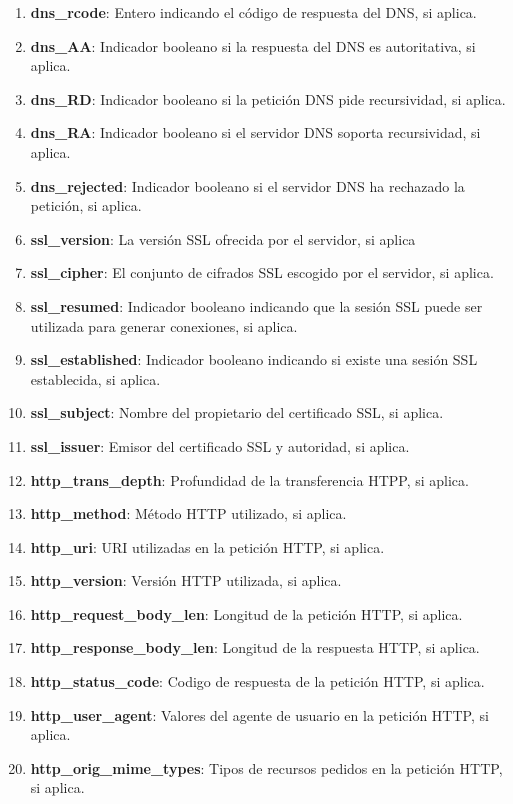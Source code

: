 \begin{enumerate}
  \item \textbf{dns\_rcode}: Entero indicando el código de respuesta del DNS, si aplica.
  \item \textbf{dns\_AA}: Indicador booleano si la respuesta del DNS es autoritativa, si aplica.
  \item \textbf{dns\_RD}: Indicador booleano si la petición DNS pide recursividad, si aplica.
  \item \textbf{dns\_RA}: Indicador booleano si el servidor DNS soporta recursividad, si aplica.
  \item \textbf{dns\_rejected}: Indicador booleano si el servidor DNS ha rechazado la petición, si aplica.
  \item \textbf{ssl\_version}: La versión SSL ofrecida por el servidor, si aplica
  \item \textbf{ssl\_cipher}: El conjunto de cifrados SSL escogido por el servidor, si aplica.
  \item \textbf{ssl\_resumed}: Indicador booleano indicando que la sesión SSL puede ser utilizada para generar conexiones, si aplica.
  \item \textbf{ssl\_established}: Indicador booleano indicando si existe una sesión SSL establecida, si aplica.
  \item \textbf{ssl\_subject}: Nombre del propietario del certificado SSL, si aplica.
  \item \textbf{ssl\_issuer}: Emisor del certificado SSL y autoridad, si aplica.
  \item \textbf{http\_trans\_depth}: Profundidad de la transferencia HTPP, si aplica.
  \item \textbf{http\_method}: Método HTTP utilizado, si aplica.
  \item \textbf{http\_uri}: URI utilizadas en la petición HTTP, si aplica.
  \item \textbf{http\_version}: Versión HTTP utilizada, si aplica.
  \item \textbf{http\_request\_body\_len}: Longitud de la petición HTTP, si aplica.
  \item \textbf{http\_response\_body\_len}: Longitud de la respuesta HTTP, si aplica.
  \item \textbf{http\_status\_code}: Codigo de respuesta de la petición HTTP, si aplica.
  \item \textbf{http\_user\_agent}: Valores del agente de usuario en la petición HTTP, si aplica.
  \item \textbf{http\_orig\_mime\_types}: Tipos de recursos pedidos en la petición HTTP, si aplica.

\end{enumerate}
